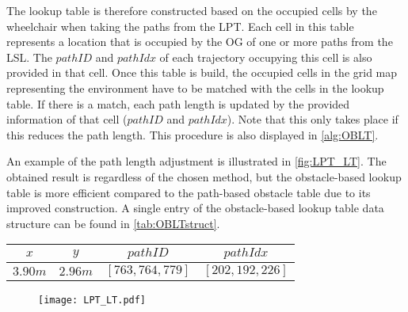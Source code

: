 The lookup table is therefore constructed based on the occupied cells by the wheelchair when taking the paths from the LPT. Each cell in this table represents a location that is occupied by the OG of one or more paths from the LSL. The $pathID$ and $pathIdx$ of each trajectory occupying this cell is also provided in that cell. Once this table is build, the occupied cells in the grid map representing the environment have to be matched with the cells in the lookup table. If there is a match, each path length is updated by the provided information of that cell ($pathID$ and $pathIdx$). Note that this only takes place if this reduces the path length. This procedure is also displayed in \cref{alg:OBLT}. 

An example of the path length adjustment is illustrated in \cref{fig:LPT_LT}. The obtained result is regardless of the chosen method, but the obstacle-based lookup table is more efficient compared to the path-based obstacle table due to its improved construction. A single entry of the obstacle-based lookup table data structure can be found in \cref{tab:OBLTstruct}.

\begin{table}[!htp]
\centering
{}
\begin{tabular}{|c|c|c|c|}
\hline
$x$			&		$y$		& $pathID$ 						& $pathIdx$				\\ \hline
$3.90m$	& $2.96m$ & $[763,764,779]$			& $[202,192,226]$	\\ \hline
\end{tabular}
\end{table}

\begin{figure}[!htbp]
\centering
\texttt{[image: LPT\_LT.pdf]}
\end{figure}


